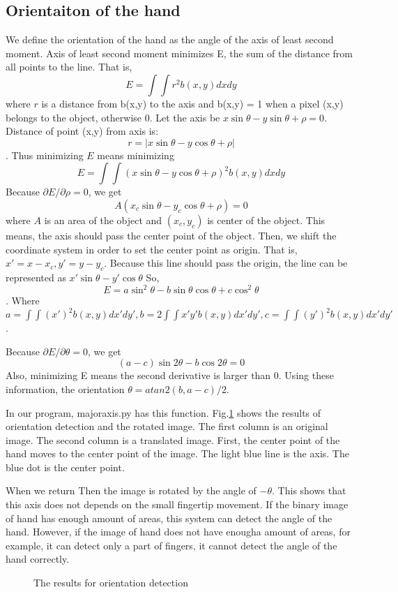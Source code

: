 \subsection{Orientaiton of the hand}
We define the orientation of the hand as the angle of the axis of least second moment.
Axis of least second moment minimizes E, the sum of the distance from all points to the line. That is,
$$E = \int \int r^2 b(x,y) dxdy$$
where $r$ is a distance from b(x,y) to the axis and b(x,y) = 1 when a pixel (x,y) belongs to the object, otherwise 0.
Let the axis be $x\sin{\theta} - y\sin{\theta} + \rho = 0$.
Distance of point (x,y) from axis is:
$$r = |x\sin{\theta}-y\cos{\theta}+\rho|$$.
Thus minimizing $E$ means minimizing
$$E = \int\int (x\sin{\theta}-y\cos{\theta}+\rho)^2 b(x,y)dxdy$$
Because $\partial E / \partial \rho = 0$, we get
$$A(x_c \sin{\theta} - y_c \cos{\theta} + \rho) = 0$$
where $A$ is an area of the object and $(x_c,y_c)$ is center of the object.
This means, the axis should pass the center point of the object.
Then, we shift the coordinate system in order to set the center point as origin.
That is, 
$x'= x - x_c, y' = y - y_c$.
Because this line should pass the origin, the line can be represented as
$x'\sin{\theta}-y'\cos{\theta}$
So, $$E = a \sin^2{\theta} - b\sin{\theta}\cos{\theta} + c\cos^2{\theta}$$.
Where $a = \int\int (x')^2 b(x,y) dx'dy', b = 2\int\int x'y' b(x,y) dx'dy', 
c = \int\int (y')^2 b(x,y)dx'dy'$.\par
Because $\partial E / \partial \theta = 0$, we get
$$(a-c)\sin{2\theta} - b\cos{2\theta} = 0$$
Also, minimizing E means the second derivative is larger than 0.
Using these information, the orientation $\theta = atan2(b,a-c)/2$.\par
In our program, majoraxis.py has this function.
Fig.\ref{fig:mom2} shows the results of orientation detection and the rotated image.
The first column is an original image.
The second column is a translated image. First, the center point of the hand moves to the center point of the image.
The light blue line is the axis. The blue dot is the center point.\par
When we return Then the image is rotated by the angle of $-\theta$.
This shows that this axis does not depends on the small fingertip movement.
If the binary image of hand has enough amount of areas, this system can detect the angle of the hand.
However, if the image of hand does not have enougha amount of areas, for example, it can detect only a part of fingers,
it cannot detect the angle of the hand correctly.
\begin{figure}
 
 \caption{The results for orientation detection}
 \label{fig:mom2}
\end{figure}
